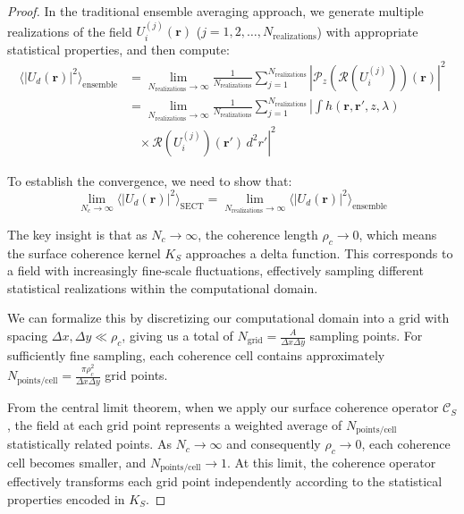 \documentclass[a4paper,12pt]{article}
\begin{document}
\begin{proof}
In the traditional ensemble averaging approach, we generate multiple realizations of the field $U_i^{(j)}(\bm{r})$ ($j = 1, 2, \ldots, N_{\text{realizations}}$) with appropriate statistical properties, and then compute:
\begin{equation}
\begin{aligned}
\langle |U_d(\bm{r})|^2 \rangle_{\text{ensemble}} 
&= \lim_{N_{\text{realizations}} \to \infty} \frac{1}{N_{\text{realizations}}} 
\sum_{j=1}^{N_{\text{realizations}}} |\mathcal{P}_z(\mathcal{R}(U_i^{(j)}))(\bm{r})|^2 \\
&= \lim_{N_{\text{realizations}} \to \infty} \frac{1}{N_{\text{realizations}}} 
\sum_{j=1}^{N_{\text{realizations}}} \left| 
\int h(\bm{r}, \bm{r}', z, \lambda) \right. \\
&\quad \left. \times\, \mathcal{R}(U_i^{(j)})(\bm{r}')\, d^2r' \right|^2
\end{aligned}
\end{equation}


To establish the convergence, we need to show that:
\begin{equation}
\lim_{N_c \to \infty} \langle |U_d(\bm{r})|^2 \rangle_{\text{SECT}} = \lim_{N_{\text{realizations}} \to \infty} \langle |U_d(\bm{r})|^2 \rangle_{\text{ensemble}}
\end{equation}

The key insight is that as $N_c \to \infty$, the coherence length $\rho_c \to 0$, which means the surface coherence 
kernel $K_S$ approaches a delta function. This corresponds to a field with increasingly fine-scale fluctuations, 
effectively sampling different statistical realizations within the computational domain.

We can formalize this by discretizing our computational domain into a grid with spacing $\Delta x, \Delta y \ll \rho_c$, 
giving us a total of $N_{\text{grid}} = \frac{A}{\Delta x \Delta y}$ sampling points. For sufficiently fine sampling, 
each coherence cell contains approximately $N_{\text{points/cell}} = \frac{\pi\rho_c^2}{\Delta x \Delta y}$ grid points.

From the central limit theorem, when we apply our surface coherence operator $\mathcal{C}_S$, the field at each grid 
point represents a weighted average of $N_{\text{points/cell}}$ statistically related points. As $N_c \to \infty$ and 
consequently $\rho_c \to 0$, each coherence cell becomes smaller, and $N_{\text{points/cell}} \to 1$. At this limit, 
the coherence operator effectively transforms each grid point independently according to the statistical properties 
encoded in $K_S$.


\end{proof}
\end{document}
